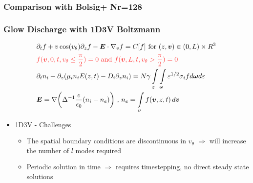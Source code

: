\documentclass[mathserif, aspectratio=169]{beamer}
\newcommand{\vect}[1]{\boldsymbol{#1}}
\newcommand{\of}[1]{\mleft( #1 \mright)}
\newcommand{\myint}{\int\limits}
\newcommand{\diff}[1]{\, d#1}
\newcommand{\vtheta}{{v_{\theta}}}
\begin{document}
\begin{frame}
	\frametitle{Comparison with Bolsig+ Nr=128}
	\begin{center}
	\end{center}
\end{frame}

\begin{frame}
	\frametitle{Glow Discharge with 1D3V Boltzmann}
	\begin{align}
		&\partial_t f + v\cos\of{\vtheta} \partial_z f -\vect{E}\cdot\nabla_v f = C[f] \text{ for } (z,\vect{v}) \in (0,L) \times R^3 \\
		&\textcolor{red!80}{f(\vect{v}, 0, t, \vtheta \leq \frac{\pi}{2})	= 0 \text{ and } f(\vect{v}, L, t, \vtheta > \frac{\pi}{2})	= 0}\\
		&\partial_t n_i + \partial_z \of{\mu_i n_i E\of{z,t} -D_i \partial_z n_i} = N \gamma \myint_{\varepsilon}\myint_{\vect{\omega}} \varepsilon^{1/2} \sigma_i f d\vect{\omega} d\varepsilon \\
		& \vect{E} = \nabla \of{\Delta^{-1}\frac{e}{\epsilon_0} \of{n_i- n_e}} \text{ , } n_e = \myint_{\vect{v}} f\of{\vect{v}, z, t} \diff{\vect{v}}
	\end{align}
	
	\begin{itemize}
		\item 1D3V - Challenges
		\begin{itemize}
			\item The spatial boundary conditions are discontinuous in $\vtheta$ $\Rightarrow$ will increase the number of $l$ modes required
			\item Periodic solution in time $\Rightarrow$ requires timestepping, no direct steady state solutions
		\end{itemize}
	\end{itemize}
\end{frame}
\end{document}
